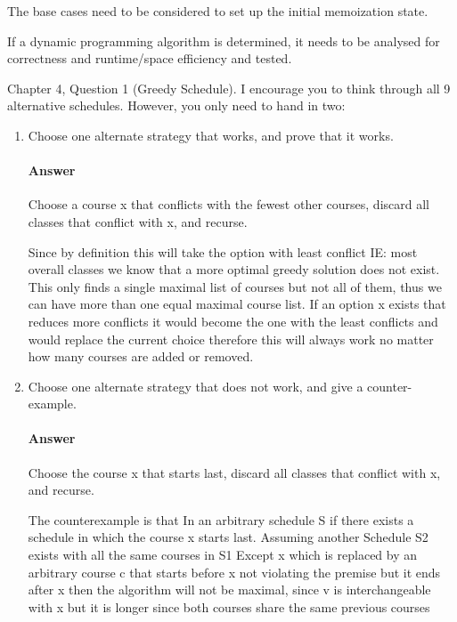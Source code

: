 \documentclass{article}
\begin{document}
The base cases need to be considered to set up the initial memoization state.

If a dynamic programming algorithm is determined, it needs to be analysed for correctness and runtime/space efficiency and tested.


Chapter 4, Question 1 (Greedy Schedule).  I encourage you to think through all 9
alternative schedules.  However, you only need to hand in two:
\begin{enumerate}
    \item Choose one alternate strategy that
        works, and prove that it works.


    \paragraph{Answer}
Choose a course x that conflicts with the fewest other courses, discard all classes that conflict with x, and recurse.

Since by definition this will take the option with least conflict IE: most overall classes we know that a more optimal greedy solution does not exist. This only finds a single maximal list of courses but not all of them, thus we can have more than one equal maximal course list. If an option x exists that reduces more conflicts it would become the one with the least conflicts and would replace the current choice therefore this will always work no matter how many courses are added or removed.

    \item Choose one alternate strategy that does not work, and give a
        counter-example.

    \paragraph{Answer}
Choose the course x that starts last, discard all classes that conflict with x, and recurse.

The counterexample is that In an arbitrary schedule S if there exists a schedule in which the course x starts last. Assuming another Schedule S2 exists with all the same courses in S1 Except x which is replaced by an arbitrary course c that starts before x not violating the premise but it ends after x then the algorithm will not be maximal, since v is interchangeable with x but it is longer since both courses share the same previous courses

\end{enumerate}
\end{document}
